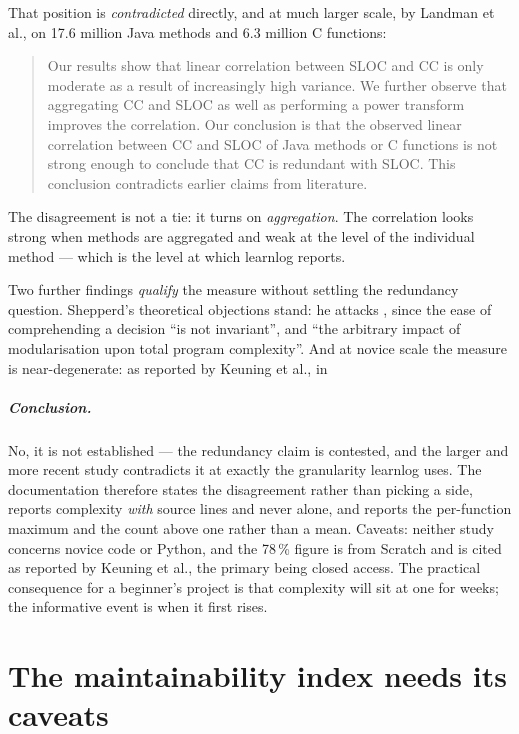 That position is \emph{contradicted} directly, and at much larger scale, by
Landman et al., on 17.6 million Java methods and 6.3 million C functions:
\blockcquote{Landman2016}{Our results show that linear correlation between
SLOC and CC is only moderate as a result of increasingly high variance. We
further observe that aggregating CC and SLOC as well as performing a power
transform improves the correlation. Our conclusion is that the observed
linear correlation between CC and SLOC of Java methods or C functions is not
strong enough to conclude that CC is redundant with SLOC. This conclusion
contradicts earlier claims from literature.}
The disagreement is not a tie: it turns on \emph{aggregation}.  The
correlation looks strong when methods are aggregated and weak at the level
of the individual method --- which is the level at which learnlog reports.

Two further findings \emph{qualify} the measure without settling the
redundancy question.  Shepperd's theoretical objections stand: he attacks
,
since the ease of comprehending a decision \enquote{is not invariant}, and
\enquote{the arbitrary impact of modularisation upon total program
complexity}.  And at novice scale the measure is
near-degenerate: as reported by Keuning et al., in

\paragraph{Conclusion.}
No, it is not established --- the redundancy claim is contested, and the
larger and more recent study contradicts it at exactly the granularity
learnlog uses.  The documentation therefore states the disagreement rather
than picking a side, reports complexity \emph{with} source lines and never
alone, and reports the per-function maximum and the count above one rather
than a mean.  Caveats: neither study concerns novice code or Python, and the
78\,\% figure is from Scratch and is cited as reported by Keuning et al.,
the primary being closed access.  The practical consequence for a beginner's
project is that complexity will sit at one for weeks; the informative event
is when it first rises.

\chapter{The maintainability index needs its caveats}
\label{app:claim:mi-caveats}

